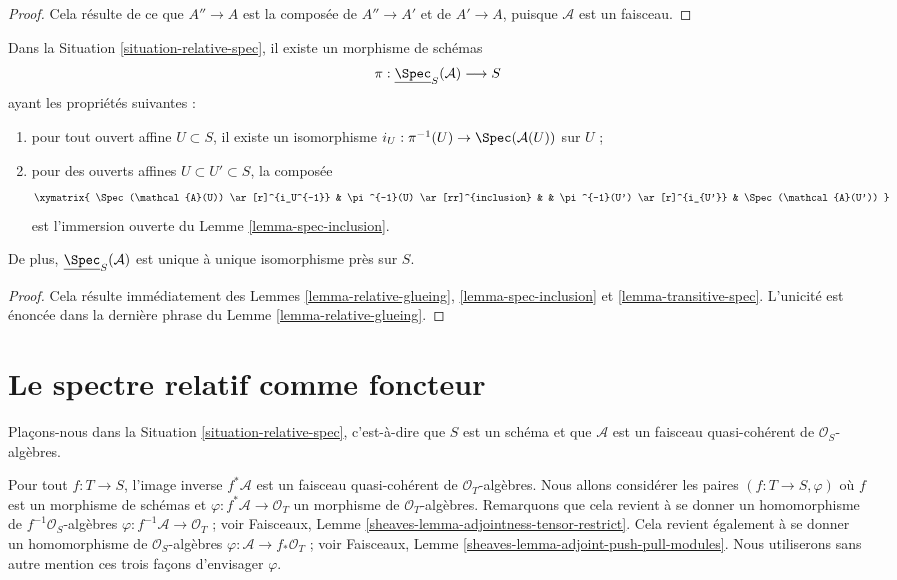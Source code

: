 \begin{proof}
Cela résulte de ce que $A'' \to A$ est la composée de $A'' \to A'$ et de
$A' \to A$, puisque $\mathcal{A}$ est un faisceau.
\end{proof}

\begin{lemma}
\label{lemma-glue-relative-spec}
Dans la Situation \ref{situation-relative-spec}, il existe un morphisme
de schémas
$$
\pi : \underline{\Spec}_S(\mathcal{A}) \longrightarrow S
$$
ayant les propriétés suivantes :
\begin{enumerate}
\item pour tout ouvert affine $U \subset S$, il existe un isomorphisme
$i_U : \pi^{-1}(U) \to \Spec(\mathcal{A}(U))$ sur $U$ ;
\item pour des ouverts affines $U \subset U' \subset S$, la composée
$$
\xymatrix{
\Spec(\mathcal{A}(U)) \ar[r]^{i_U^{-1}} &
\pi^{-1}(U) \ar[rr]^{inclusion} & &
\pi^{-1}(U') \ar[r]^{i_{U'}} &
\Spec(\mathcal{A}(U'))
}
$$
est l'immersion ouverte du Lemme \ref{lemma-spec-inclusion}.
\end{enumerate}
De plus, $\underline{\Spec}_S(\mathcal{A})$ est unique à unique
isomorphisme près sur $S$.
\end{lemma}

\begin{proof}
Cela résulte immédiatement des
Lemmes \ref{lemma-relative-glueing},
\ref{lemma-spec-inclusion} et
\ref{lemma-transitive-spec}.
L'unicité est énoncée dans la dernière phrase du
Lemme \ref{lemma-relative-glueing}.
\end{proof}












\section{Le spectre relatif comme foncteur}
\label{section-spec}

\noindent
Plaçons-nous dans la Situation \ref{situation-relative-spec}, c'est-à-dire que
$S$ est un schéma et que $\mathcal{A}$ est un faisceau quasi-cohérent de
$\mathcal{O}_S$-algèbres.

\medskip\noindent
Pour tout $f : T \to S$, l'image inverse
$f^*\mathcal{A}$ est un faisceau quasi-cohérent de $\mathcal{O}_T$-algèbres.
Nous allons considérer les paires $(f : T \to S, \varphi)$ où
$f$ est un morphisme de schémas et $\varphi : f^*\mathcal{A} \to \mathcal{O}_T$
un morphisme de $\mathcal{O}_T$-algèbres. Remarquons que cela revient à se
donner un homomorphisme de $f^{-1}\mathcal{O}_S$-algèbres
$\varphi : f^{-1}\mathcal{A} \to \mathcal{O}_T$ ; voir
Faisceaux, Lemme \ref{sheaves-lemma-adjointness-tensor-restrict}.
Cela revient également à se donner un
homomorphisme de $\mathcal{O}_S$-algèbres
$\varphi : \mathcal{A} \to f_*\mathcal{O}_T$ ; voir
Faisceaux, Lemme \ref{sheaves-lemma-adjoint-push-pull-modules}.
Nous utiliserons sans autre mention ces trois façons d'envisager $\varphi$.


